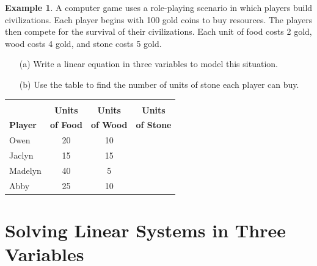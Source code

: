 \documentclass{report}
\theoremstyle{definition}
\newtheorem{example}{\bf Example}
\begin{document}
\begin{example}
A computer game uses a role-playing scenario in which players build civilizations. Each player begins with 100 gold coins to buy resources. The players then compete for the survival of their civilizations. Each unit of food costs 2 gold, wood costs 4 gold, and stone costs 5 gold.
\end{example}

\begin{itemize}
\item[(a)] Write a linear equation in three variables to model this situation. 
\end{itemize}

\vfill
\begin{itemize}
\item[(b)] Use the table to find the number of units of stone each player can buy. 
\end{itemize}

\begin{flushright}
\begin{tabular}{|l|c|c|c|}
\hline
&&&\\
&\textbf{Units}&\textbf{Units}&\textbf{Units}\\
\textbf{Player}&\textbf{of Food}&\textbf{of Wood}&\textbf{of Stone}\\
\hline
Owen&20&10&\\
\hline
Jaclyn&15&15&\\
\hline
Madelyn&40&5&\\
\hline
Abby&25&10&\\
\hline
\end{tabular}
\end{flushright}
\vfill
\vfill




\vfill
 \noindent{}
 \newpage

 \section{  Solving Linear Systems in Three Variables  }
 \setcounter{example}{0}
 \setcounter{definition}{0}
\end{document}
